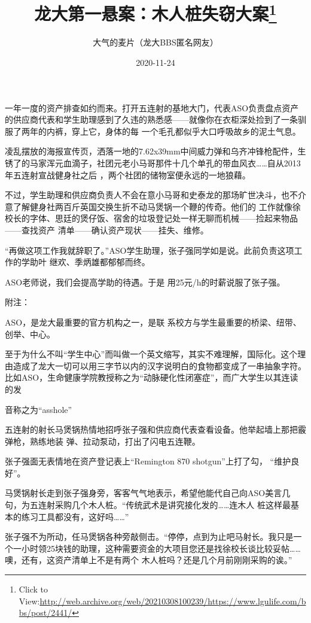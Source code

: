 \documentclass{article}
\title{龙大第一悬案：木人桩失窃大案\footnote{Click to View:\url{http://web.archive.org/web/20210308100239/https://www.lgulife.com/bbs/post/2441/}}}
\author{大气的麦片（龙大BBS匿名网友）}
\date{2020-11-24}
\begin{document}

\maketitle


\Large

﻿一年一度的资产排查如约而来。打开五连射的基地大门，代表ASO负责盘点资产的供应商代表和学生助理感到了久违的熟悉感——就像你在衣柜深处捡到了一条驯服了两年的内裤，穿上它，身体的每
一个毛孔都似乎大口呼吸故乡的泥土气息。 

凌乱摆放的海报宣传页，洒落一地的7.62x39mm中间威力弹和乌齐冲锋枪配件，生锈了的马家浑元血滴子，社团元老小马哥那件十几个单孔的带血风衣……自从2013年五连射宣战健身社之后
，两个社团的储物室便永远的一地狼藉。 

不过，学生助理和供应商负责人不会在意小马哥和史泰龙的那场旷世决斗，也不介意了解健身社两百斤英国交换生折不动马煲锅一个鞭的传奇。他们的
\newpage
工作就像徐校长的字体、思廷的煲仔饭、宿舍的垃圾登记处一样无聊而机械——捡起来物品——查找资产
清单——确认资产现状——挂失、维修。 

“再做这项工作我就辞职了。”ASO学生助理，张子强同学如是说。此前负责这项工作的学助叶
继欢、季炳雄都郁郁而终。 

ASO老师说，我们会提高学助的待遇。于是
用25元/h的时薪说服了张子强。 


附注： 

ASO，是龙大最重要的官方机构之一，是联
系校方与学生最重要的桥梁、纽带、创举、中心。 

至于为什么不叫“学生中心”而叫做一个英文缩写，其实不难理解，国际化。这个理由造成了龙大一切可以用三字节以内的汉字说明白的食物都变成了一串抽象字符。比如ASO，生命健康学院教授称之为“动脉硬化性闭塞症”，而广大学生以其连读的发
\newpage

音称之为“asshole” 

五连射的射长马煲锅热情地招呼张子强和供应商代表查看设备。他举起墙上那把霰弹枪，熟练地装
弹、拉动泵动，打出了闪电五连鞭。 

张子强面无表情地在资产登记表上“Remington 870 shotgun”上打了勾，
“维护良好”。 

马煲锅射长走到张子强身旁，客客气气地表示，希望他能代自己向ASO美言几句，为五连射采购几个木人桩。“传统武术是讲究接化发的……连木人
桩这样最基本的练习工具都没有，这好吗……” 

张子强不为所动，任马煲锅各种旁敲侧击。“停停，点到为止吧马射长。我只是一个一小时领25块钱的助理，这种需要资金的大项目您还是找徐校长谈比较妥帖……噢，还有，这资产清单上不是有两个
木人桩吗？还是几个月前刚刚采购的诶。” 
\end{document}
